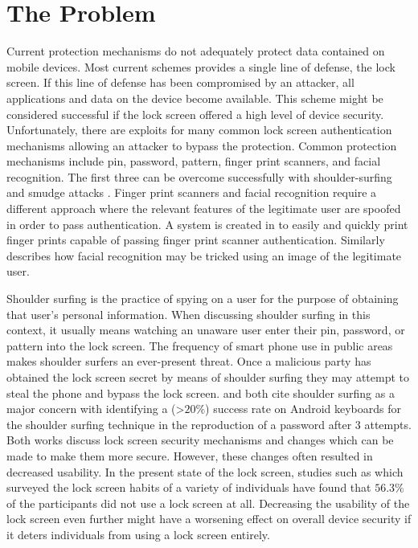 \section{The Problem}
\label{the_problem}
Current protection mechanisms do not adequately protect
data contained on mobile devices.
Most current schemes provides a single line of defense,
the lock screen.
If this line of defense has been compromised
by an attacker,
all applications and data on the device become available.
%
This scheme might be considered successful 
if the lock screen offered a high level of device security.
Unfortunately, there are exploits for many common lock screen 
authentication mechanisms 
allowing an attacker to bypass the protection.
%
Common protection mechanisms include
pin, password, pattern, finger print scanners, and facial recognition.
%
The first three can be overcome successfully with 
shoulder-surfing \cite{schaub2012password} and smudge attacks \cite{aviv2010smudge}.
Finger print scanners and facial recognition require a different approach
where the relevant features of the legitimate user are spoofed
in order to pass authentication.
%
A system is created in \cite{cao2016hacking} 
to easily and quickly print finger prints
capable of passing finger print scanner authentication.
%
Similarly \cite{de2013can} describes how
facial recognition may be tricked using an image of the legitimate user.

%
Shoulder surfing is the practice of spying
on a user for the purpose of
obtaining that user's personal information.
%
When discussing shoulder surfing in this context,
it usually means watching an unaware user 
enter their pin, password, or pattern into
the lock screen.
%
The frequency of smart phone use in public areas
makes shoulder surfers an ever-present threat.
%
Once a malicious party has obtained
the lock screen secret by means of shoulder surfing
they may attempt to steal the phone and bypass the lock screen.
%
\cite{schaub2012password} and \cite{hafiz2008towards} both
cite shoulder surfing as a major concern with 
\cite{schaub2012password} identifying
a (\textgreater$20\%$) success rate
on Android keyboards
for the shoulder surfing technique
in the reproduction of a password after $3$ attempts.
%
Both works discuss lock screen security mechanisms
and changes which can be made to make them more secure.
However, these changes often resulted in 
decreased usability.
%
In the present state of the lock screen,
studies such as \cite{harbach2014sa} 
which surveyed the lock screen habits of a variety of individuals
have found that
$56.3\%$ of the participants
did not use a lock screen at all.
%
Decreasing the usability of the lock screen even further might
have a worsening effect on overall device security if
it deters individuals from using a lock screen entirely. 

